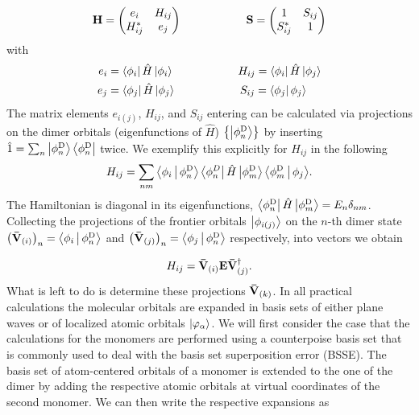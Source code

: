 %
\begin{equation}
  \mathbf{ H } = 
  \begin{pmatrix}
    e_i    &  H_{ij} \\
    H_{ij}^* &  e_j  
  \end{pmatrix} \hspace{2cm}
  \mathbf{ S } = 
  \begin{pmatrix}
    1    &  S_{ij} \\
    S_{ij}^* &  1  
  \end{pmatrix}
  \label{equ:dipro_eq3}
\end{equation}
%
with 
%
\begin{equation}
 \begin{aligned}
  e_i &= \Bra{\phi_i}\oper{H} \Ket{\phi_i} \hspace{2cm}  H_{ij} = \Bra{\phi_i}\oper{H} \Ket{\phi_j}\\
  e_j &= \Bra{\phi_j}\oper{H} \Ket{\phi_j} \hspace{2cm}  S_{ij} = \Bra{\phi_j} \phi_j\rangle %
 \end{aligned}
  \label{equ:dipro_eq4}
\end{equation}
The matrix elements $e_{i(j)}$, $H_{ij}$, and $S_{ij}$ entering  can be calculated via projections on the dimer orbitals (eigenfunctions of $\hat{H}$) $\left\{\Ket{\phi^\text{D}_n}\right\}$ by inserting $\hat{ 1 } = \sum_n \Ket{\phi^\text{D}_n}\Bra{\phi^\text{D}_n}$ twice. We exemplify this explicitly for $H_{ij}$ in the following
%
\begin{equation}
  H_{ij} = \sum_{nm}{\Braket{\phi_i|\phi^\text{D}_n} \Bra{\phi^{D}_n}\hat{H}\Ket{\phi^\text{D}_m}\Braket{\phi^\text{D}_m|\phi_j}} .
  \label{eq:dipro_eq16}
\end{equation}
%
The Hamiltonian is diagonal in its eigenfunctions, $\Bra{\phi^\text{D}_n}\hat{ H }\Ket{\phi^\text{D}_m} = E_n \delta_{nm}$. Collecting the projections of the frontier orbitals  $\Ket{\phi_{i(j)}}$ on the $n$-th dimer state $\left(\mathbf{ \bar{V} }_{(i)}\right)_n= \Braket{\phi_i|\phi^\text{D}_n}$ and $\left(\mathbf{ \bar{V} }_{(j)}\right)_n=\Braket{\phi_j|\phi^\text{D}_n}$ respectively, into vectors we obtain

\begin{equation}
   H_{ij} = \mathbf{ \bar{V} }_{(i)} \mathbf{ E }   \mathbf{ \bar{V} }_{(j)}^\dagger .
  \label{eq:dipro_eq17}
\end{equation}
%
What is left to do is determine these projections $\mathbf{ \bar{V} }_{(k)}$. In all practical calculations the molecular orbitals are expanded in basis sets of either plane waves or of localized atomic orbitals $\Ket{\varphi_\alpha}$. We will first consider the case that the calculations for
the monomers are performed using a counterpoise basis set that is commonly used to deal with the basis set superposition error (BSSE). The basis set of atom-centered orbitals of a monomer is extended to the one of the dimer by adding the respective atomic orbitals at virtual coordinates of the second monomer. We can then write the respective expansions as

